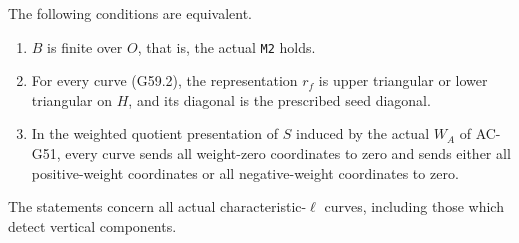 \begin{theorem}
\label{AC-G59}
The following conditions are equivalent.
\begin{enumerate}
\item \(B\) is finite over \(O\), that is, the actual
      \texttt{M2} holds.
\item For every curve (G59.2), the representation \(r_f\)
      is upper triangular or lower triangular on \(H\),
      and its diagonal is the prescribed seed diagonal.
\item In the weighted quotient presentation of \(S\)
      induced by the actual \(W_A\) of AC-G51, every
      curve sends all weight-zero coordinates to zero
      and sends either all positive-weight coordinates
      or all negative-weight coordinates to zero.
\end{enumerate}
The statements concern all actual characteristic-\(\ell\)
curves, including those which detect vertical components.
\end{theorem}
